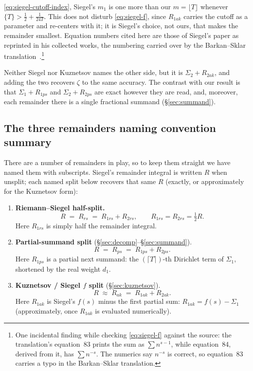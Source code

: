 \documentclass[11pt]{article}
\theoremstyle{definition}
\begin{document}
\eqref{eq:siegel-cutoff-index}, Siegel's $m_{1}$ is one more than our
$m=\lfloor T\rfloor$ whenever $\{T\}>\tfrac12+\tfrac1{24T}$. This does not disturb
\eqref{eq:siegel-f}, since $R_{1ak}$ carries the cutoff as a parameter and
re-centers with it; it is Siegel's choice, not ours, that makes the remainder
smallest. Equation numbers cited here are those of Siegel's paper as reprinted
in his collected works, the numbering carried over by the Barkan--Sklar
translation~\cite{BarkanSklar2018}.\footnote{One incidental finding while
checking \eqref{eq:siegel-f} against the source: the translation's
equation~83 prints the sum as $\sum n^{s-1}$, while equation~84, derived from
it, has $\sum n^{-s}$. The numerics say $n^{-s}$ is correct, so equation~83
carries a typo in the Barkan--Sklar translation.}

Neither Siegel
nor Kuznetsov names the other side, but it is $\Sigma_2+R_{2ak}$, and adding the
two recovers $\zeta$ to the same accuracy. The contrast with our result is that
$\Sigma_1+R_{1ps}$ and $\Sigma_2+R_{2ps}$ are exact however they are read, and,
moreover, each remainder there is a single fractional summand
(\S\ref{sec:summand}).

\subsection{The three remainders naming convention summary}\label{sec:remainders-summary}

There are a number of remainders in play, so to keep them straight we have named
them with subscripts. Siegel's remainder integral is written $R$ when unsplit; each
named split below recovers that same $R$ (exactly, or approximately for the
Kuznetsov form):
\begin{enumerate}
\item \textbf{Riemann--Siegel half-split.}
\[
R \;=\; R_{rs} \;=\; R_{1rs}+R_{2rs},
\qquad
R_{1rs}=R_{2rs}=\tfrac12 R.
\]
Here $R_{1rs}$ is simply half the remainder integral.
\item \textbf{Partial-summand split} (\S\ref{sec:decomp}--\S\ref{sec:summand}).
\[
R \;=\; R_{ps} \;=\; R_{1ps}+R_{2ps}.
\]
Here $R_{1ps}$ is a partial next summand: the $(\lceil T\rceil)$-th Dirichlet
term of $\Sigma_1$, shortened by the real weight $d_1$.
\item \textbf{Kuznetsov / Siegel $f$ split} (\S\ref{sec:kuznetsov}).
\[
R \;\approx\; R_{ak} \;=\; R_{1ak}+R_{2ak}.
\]
Here $R_{1ak}$ is Siegel's $f(s)$ minus the first partial sum:
$R_{1ak}=f(s)-\Sigma_1$ (approximately, once $R_{1ak}$ is evaluated
numerically).
\end{enumerate}
\end{document}
